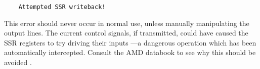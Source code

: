 \begin{verbatim}
	Attempted SSR writeback!
\end{verbatim}
This error should never occur in normal use, unless manually manipulating the output lines.
The current control signals, if transmitted, could have caused the SSR registers to try driving their inputs ---a dangerous operation which has been automatically intercepted.
Consult the AMD databook to see why this should be avoided \cite{amd:logic}.











 
